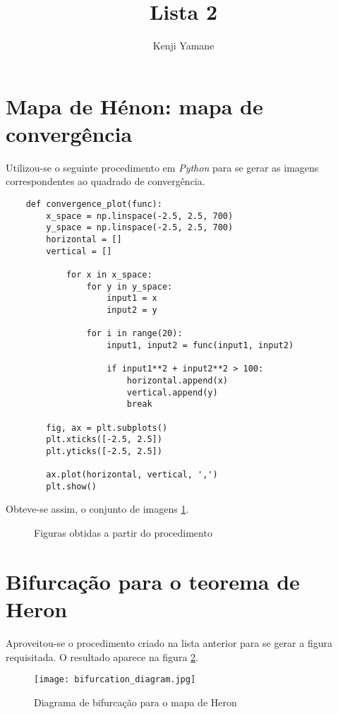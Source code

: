 \documentclass{article}[twocolumn]
\title{Lista 2}
\author{Kenji Yamane}
\begin{document}
	\maketitle
	\newpage
	\section{Mapa de Hénon: mapa de convergência}
	Utilizou-se o seguinte procedimento em \textit{Python} para se gerar as imagens correspondentes
	ao quadrado de convergência.
	\begin{verbatim}
	def convergence_plot(func):
    	x_space = np.linspace(-2.5, 2.5, 700)
    	y_space = np.linspace(-2.5, 2.5, 700)
    	horizontal = []
    	vertical = []
    
        	for x in x_space:
            	for y in y_space:
                	input1 = x
                	input2 = y
        
            	for i in range(20):
                	input1, input2 = func(input1, input2)
    
                	if input1**2 + input2**2 > 100:
                    	horizontal.append(x)
                    	vertical.append(y)
                    	break
    	
    	fig, ax = plt.subplots()
    	plt.xticks([-2.5, 2.5])
    	plt.yticks([-2.5, 2.5])
    
    	ax.plot(horizontal, vertical, ',')
    	plt.show()
	\end{verbatim}
	Obteve-se assim, o conjunto de imagens \ref{fig:convergence}.
	\begin{figure}[H]
		\centering
		\begin{subfigure} {
			\texttt{[image: heron\_convergence1.jpg]}
		} \end{subfigure}
		\begin{subfigure} {
			\texttt{[image: heron\_convergence2.jpg]}
		} \end{subfigure}
		\caption{Figuras obtidas a partir do procedimento}
		\label{fig:convergence}
	\end{figure}
	\section{Bifurcação para o teorema de Heron}
	Aproveitou-se o procedimento criado na lista anterior para se gerar a figura requisitada.
	O resultado aparece na figura \ref{fig:bifurcation}.
	\begin{figure}[H]
		\centering
		\texttt{[image: bifurcation\_diagram.jpg]}
		\caption{Diagrama de bifurcação para o mapa de Heron}
		\label{fig:bifurcation}
	\end{figure}
\end{document}
